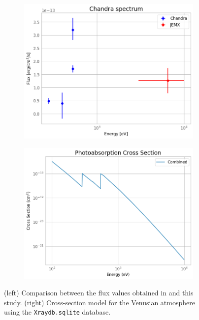     \begin{figure}[H]
        \centering
        \begin{subfigure}{0.42\textwidth}
            \includegraphics[width=\textwidth]{report/Figures/results/spectra_comp.png}
        \end{subfigure}%
        \hspace{1em}
        \begin{subfigure}{0.42\textwidth}
            \centering
            \includegraphics[width=\textwidth]{report/Figures/discussion/crosssection.png}
        \end{subfigure}
        \caption{(left) Comparison between the flux values obtained in \cite{Dennerl2002DiscoveryChandra} and this study. (right) Cross-section model for the Venusian atmosphere using the \texttt{Xraydb.sqlite} database.}
        \label{comp_spec}
    \end{figure}

